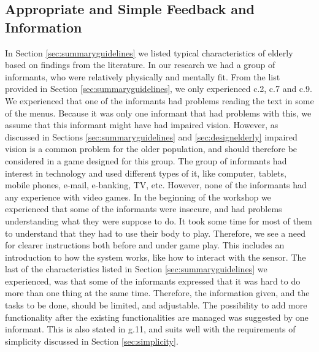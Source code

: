 \subsection{Appropriate and Simple Feedback and Information}
In Section \ref{sec:summaryguidelines} we listed typical characteristics of elderly based on findings from the literature. In our research we had a group of informants, who were relatively physically and mentally fit. From the list provided in Section \ref{sec:summaryguidelines}, we only experienced c.2, c.7 and c.9. We experienced that one of the informants had problems reading the text in some of the menus. Because it was only one informant that had problems with this, we assume that this informant might have had impaired vision. However, as discussed in Sections \ref{sec:summaryguidelines} and  \ref{sec:designelderly} impaired vision is a common problem for the older population, and should therefore be considered in a game designed for this group. The group of informants had interest in technology and used different types of it, like computer, tablets, mobile phones, e-mail, e-banking, TV, etc. However, none of the informants had any experience with video games. In the beginning of the workshop we experienced that some of the informants were insecure, and had problems understanding what they were suppose to do. It took some time for most of them to understand that they had to use their body to play. Therefore, we see a need for clearer instructions both before and under game play. This includes an introduction to how the system works, like how to interact with the sensor. The last of the characteristics listed in Section \ref{sec:summaryguidelines}  we experienced, was that some of the informants expressed that it was hard to do more than one thing at the same time. Therefore, the information given, and the tasks to be done, should be limited, and adjustable. The possibility to add more functionality after the existing functionalities are managed was suggested by one informant. This is also stated in g.11, and suits well with the requirements of simplicity discussed in Section \ref{sec:simplicity}. 

